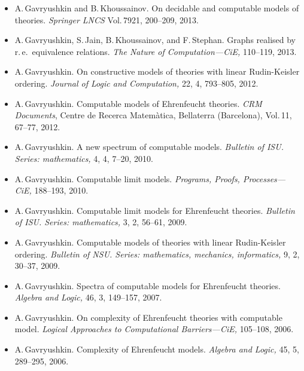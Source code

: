 \documentclass[12pt]{article}
\begin{document}
\begin{itemize}
	{\em Combinatorial Algorithms,} LNCS 8288, 178--189, 2013.
\item A.\,Gavryushkin and B.\,Khoussainov.
	On decidable and computable models of theories.
	{\em Springer LNCS} Vol.\,7921, 200--209, 2013.
\item A.\,Gavryushkin, S.\,Jain, B.\,Khoussainov, and F.\,Stephan.
	Graphs realised by r.\,e.\ equivalence relations.
	{\em The Nature of Computation---CiE,} 110--119, 2013.	
\item A.\,Gavryushkin.
	On constructive models of theories with linear Rudin-Keisler ordering.
	{\em Journal of Logic and Computation,} 22, 4, 793--805, 2012.
\item A.\,Gavryushkin.
	Computable models of Ehrenfeucht theories.
	{\em CRM Documents}, Centre de Recerca Matem\`atica, Bellaterra (Barcelona), Vol.\,11, 67--77, 2012.
\item A.\,Gavryushkin.
	A new spectrum of computable models.
	{\em Bulletin of ISU.
	Series: mathematics,} 4, 4, 7--20, 2010.
\item A.\,Gavryushkin.
	Computable limit models.
	{\em Programs, Proofs, Processes---CiE,} 188--193, 2010.
\item A.\,Gavryushkin.
	Computable limit models for Ehrenfeucht theories.
	{\em Bulletin of ISU.
	Series: mathematics,} 3, 2, 56--61, 2009.
\item A.\,Gavryushkin.
	Computable models of theories with linear Rudin-Keisler ordering.
	{\em Bulletin of NSU.
	Series: mathematics, mechanics, informatics,} 9, 2, 30--37, 2009.
\item A.\,Gavryushkin.
	Spectra of computable models for Ehrenfeucht theories.
	{\em Algebra and Logic,} 46, 3, 149--157, 2007.
\item A.\,Gavryushkin.
	On complexity of Ehrenfeucht theories with computable model.
	{\em Logical Approaches to Computational Barriers---CiE,} 105--108, 2006.
\item A.\,Gavryushkin.
	Complexity of Ehrenfeucht models.
	{\em Algebra and Logic,} 45, 5, 289--295, 2006.
\end{itemize}
\end{document}
